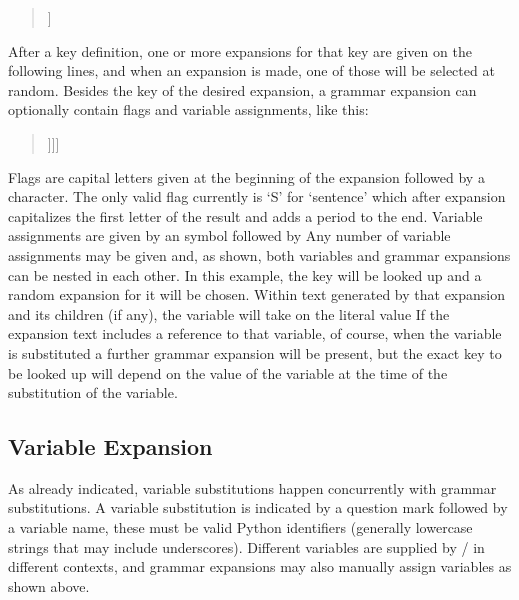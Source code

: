 \begin{quote}
  \ttfamily
  [[action/attack/option]]
\end{quote}

After a key definition, one or more expansions for that key are given on the following lines, and when an expansion is made, one of those will be selected at random.
%
Besides the key of the desired expansion, a grammar expansion can optionally contain flags and variable assignments, like this:

\begin{quote}
  \ttfamily
  [[S|misc/you\_ask\_for@statement=[[action/?\_action/option]]]]
\end{quote}

Flags are capital letters given at the beginning of the expansion followed by a \exchar{|} character.
%
The only valid flag currently is `S' for `sentence' which after expansion capitalizes the first letter of the result and adds a period to the end.
%
Variable assignments are given by an  symbol followed by 
%
Any number of variable assignments may be given and, as shown, both variables
and grammar expansions can be nested in each other.
%
In this example, the key  will be looked up and a random expansion for it will be chosen.
%
Within text generated by that expansion and its children (if any), the variable  will take on the literal value 
%
If the expansion text includes a reference to that variable, of course, when the variable is substituted a further grammar expansion will be present, but the exact key to be looked up will depend on the value of the variable  at the time of the substitution of the  variable.


\subsection{Variable Expansion}

As already indicated, variable substitutions happen concurrently with grammar substitutions.
%
A variable substitution is indicated by a question mark followed by a variable name, these must be valid Python identifiers (generally lowercase strings that may include underscores).
%
Different variables are supplied by \dunyazad/ in different contexts, and grammar expansions may also manually assign variables as shown above.


